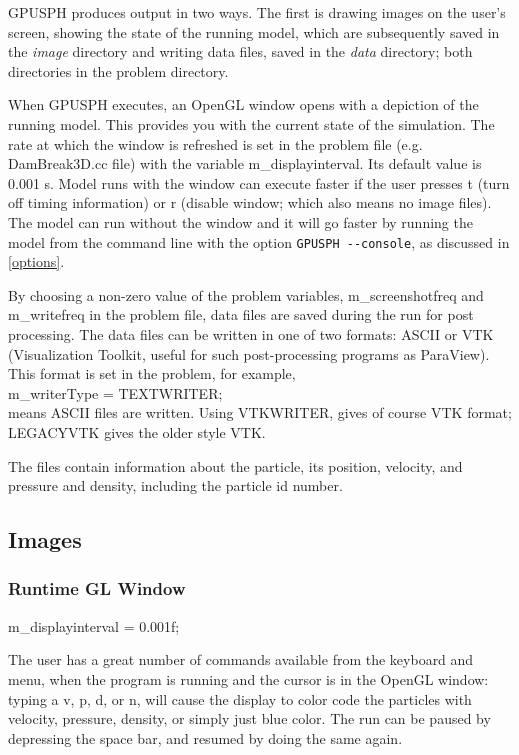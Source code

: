\documentclass[12pt]{memoir}
\begin{document}
{{{GPUSPH produces output in two ways. The first is drawing images on the
user's screen, showing the state of the running model, which are
subsequently saved in the {\em image} directory and writing data files,
saved in the {\em data} directory; both directories in the problem
directory.


When GPUSPH executes, an OpenGL window opens with a depiction of the
running model. This provides you with the current state of the
simulation. The rate at which the window is refreshed is set in the
problem file (e.g. DamBreak3D.cc file) with the variable
m\_displayinterval. Its default value is 0.001 s. Model runs with the
window can execute faster if the user presses t (turn off timing
information) or r (disable window; which also means no image files).
The model can run without the window and it will go faster by running
the model from the command line with the option \verb!GPUSPH --console!,
as discussed in \ref{options}.

By choosing a non-zero value of the problem variables, m\_screenshotfreq
and m\_writefreq in the problem file, data files are saved during the
run for post processing. The data files can be written in one of two
formats: ASCII or VTK (Visualization Toolkit, useful for such
post-processing programs as ParaView). This format is set in the
problem, for example, \\ m\_writerType = TEXTWRITER;\\ means ASCII files
are written. Using VTKWRITER, gives of course VTK format; LEGACYVTK
gives the older style VTK.



The files contain information about the particle, its position,
velocity, and pressure and density, including the particle id number.

\subsection{Images} \subsubsection{Runtime GL Window}

m\_displayinterval = 0.001f;

The user has a great number of commands available from the keyboard and
menu, when the program is running and the cursor is in the OpenGL
window: typing a v, p, d, or n, will cause the display to color code
the particles with velocity, pressure, density, or simply just blue
color. The run can be paused by depressing the space bar, and resumed
by doing the same again.

}}}
\end{document}
